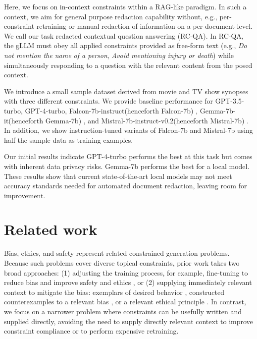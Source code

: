 \documentclass[11pt]{article}
\newcommand{\gptthree}{GPT-3.5-turbo\xspace}
\newcommand{\gptfour}{GPT-4-turbo\xspace}
\newcommand{\falconlong}{Falcon-7b-instruct\xspace}
\newcommand{\falcon}{Falcon-7b\xspace}
\newcommand{\gemmalong}{Gemma-7b-it\xspace}
\newcommand{\gemma}{Gemma-7b\xspace}
\newcommand{\mistrallong}{Mistral-7b-instruct-v0.2\xspace}
\newcommand{\mistral}{Mistral-7b\xspace}
\begin{document}
Here, we focus on in-context constraints within a RAG-like paradigm. In such a context, we aim for general purpose redaction capability without, e.g., per-constraint retraining or manual redaction of information on a per-document level. We call our task redacted contextual question answering (RC-QA). In RC-QA, the gLLM must obey all applied constraints provided as free-form text (e.g., \textit{Do not mention the name of a person}, \textit{Avoid mentioning injury or death}) while simultaneously responding to a question with the relevant content from the posed context.

We introduce a small sample dataset derived from movie and TV show synopses with three different constraints. We provide baseline performance for \gptthree, \gptfour \cite{achiam2023gpt}, \falconlong (henceforth \falcon) \cite{almazrouei2023falcon}, \gemmalong (henceforth \gemma) \cite{team2024gemma}, and \mistrallong (henceforth \mistral) \cite{jiang2023mistral}. In addition, we show instruction-tuned variants of \falcon and \mistral using half the sample data as training examples.

Our initial results indicate \gptfour performs the best at this task but comes with inherent data privacy risks. \gemma performs the best for a local model. These results show that current state-of-the-art local models may not meet accuracy standards needed for automated document redaction, leaving room for improvement.

\section{Related work}

Bias, ethics, and safety represent related constrained generation problems. Because such problems cover diverse topical constraints, prior work takes two broad approaches: (1) adjusting the training process, for example, fine-tuning to reduce bias and improve safety and ethics \cite{fei-etal-2023-mitigating, gallegos2024bias}, or
(2) supplying immediately relevant context to mitigate the bias:
exemplars of desired behavior \cite{meade-etal-2023-using},
constructed counterexamples to a relevant bias \cite{oba-etal-2024-contextual}, or a relevant ethical principle \cite{rao-etal-2023-ethical}.
In contrast, we focus on a narrower problem where constraints can be usefully written and supplied directly, avoiding the need to supply directly relevant context to improve constraint compliance or to perform expensive retraining.
\end{document}
